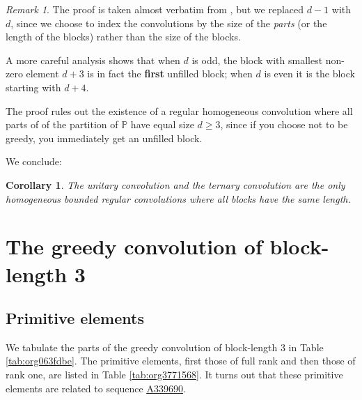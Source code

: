 \documentclass[12pt]{article}
\theoremstyle{definition}
\theoremstyle{remark}
\newtheorem{remark}{Remark}
\theoremstyle{plain}
\newtheorem{corollary}[lemma]{Corollary}
\newcommand{\NNp}{{\mathbb{P}}}
\newcommand{\seqnum}[1]{\href{https://oeis.org/#1}{\textrm \underline{#1}}}
\begin{document}
\begin{remark}
The proof is taken almost verbatim from \cite{Gavell:Regular},
but we replaced \(d-1\) with \(d\), since we choose to index
the convolutions by the size of the \emph{parts} (or the length of the blocks) rather than the size of the blocks.

A more careful analysis shows that when \(d\) is odd, the block with smallest non-zero element \(d+3\)
is in fact the \textbf{first} unfilled block; when \(d\) is even it is the block starting with \(d+4\).

The proof rules out the existence of a regular homogeneous convolution where all parts of of the
partition of \(\NNp\) have equal size \(d \ge 3\),
since if you choose not to be greedy, you immediately get an unfilled block.
\label{orgd2651e8}
\end{remark}

We conclude:
\begin{corollary}
The unitary convolution and the ternary convolution are the only homogeneous bounded regular convolutions where all blocks have the same length.
\label{org6ef57c1}
\end{corollary}
\section{The greedy convolution of block-length 3}
\label{sec:org1f75020}

\subsection{Primitive elements}
\label{sec:org81de2f9}
We tabulate the parts of the greedy convolution of block-length 3 in Table \ref{tab:org063fdbe}.
The primitive elements, first those of full rank and then those of rank one, are listed in Table \ref{tab:org3771568}.
It turns out that these primitive elements are related to sequence
 \seqnum{A339690}.
\end{document}
